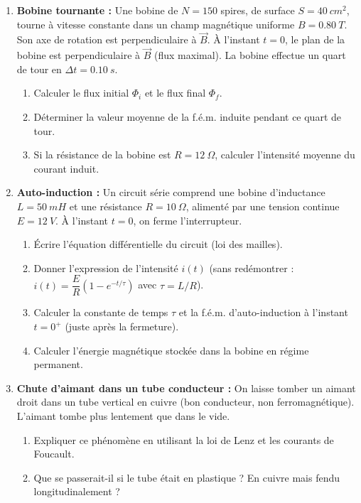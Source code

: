 \documentclass[11pt]{article}
\begin{document}
\begin{exercice}
\begin{enumerate}
\item \textbf{Bobine tournante :} Une bobine de $N = 150$ spires, de surface $S = \SI{40}{cm^2}$, tourne à vitesse constante dans un champ magnétique uniforme $B = \SI{0,80}{T}$. Son axe de rotation est perpendiculaire à $\vec{B}$. À l'instant $t=0$, le plan de la bobine est perpendiculaire à $\vec{B}$ (flux maximal). La bobine effectue un quart de tour en $\Delta t = \SI{0,10}{s}$.
\begin{enumerate}
\item Calculer le flux initial $\Phi_i$ et le flux final $\Phi_f$.
\item Déterminer la valeur moyenne de la f.é.m. induite pendant ce quart de tour.
\item Si la résistance de la bobine est $R = \SI{12}{\Omega}$, calculer l'intensité moyenne du courant induit.
\end{enumerate}
\item \textbf{Auto-induction :} Un circuit série comprend une bobine d'inductance $L = \SI{50}{mH}$ et une résistance $R = \SI{10}{\Omega}$, alimenté par une tension continue $E = \SI{12}{V}$. À l'instant $t=0$, on ferme l'interrupteur.
\begin{enumerate}
\item Écrire l'équation différentielle du circuit (loi des mailles).
\item Donner l'expression de l'intensité $i(t)$ (sans redémontrer : $i(t) = \dfrac{E}{R}(1 - e^{-t/\tau})$ avec $\tau = L/R$).
\item Calculer la constante de temps $\tau$ et la f.é.m. d'auto-induction à l'instant $t=0^+$ (juste après la fermeture).
\item Calculer l'énergie magnétique stockée dans la bobine en régime permanent.
\end{enumerate}
\item \textbf{Chute d'aimant dans un tube conducteur :} On laisse tomber un aimant droit dans un tube vertical en cuivre (bon conducteur, non ferromagnétique). L'aimant tombe plus lentement que dans le vide.
\begin{enumerate}
\item Expliquer ce phénomène en utilisant la loi de Lenz et les courants de Foucault.
\item Que se passerait-il si le tube était en plastique ? En cuivre mais fendu longitudinalement ?
\end{enumerate}
\end{enumerate}
\end{exercice}
\end{document}
